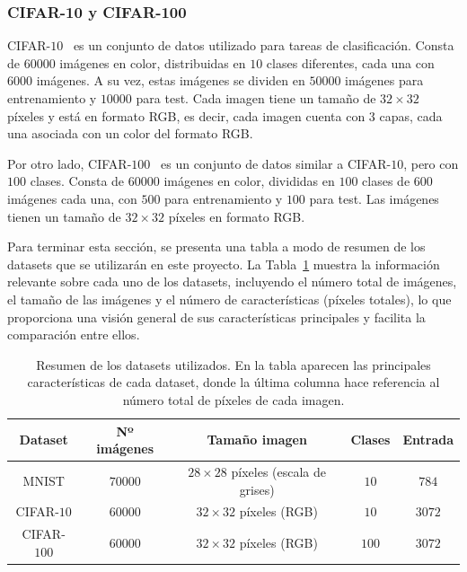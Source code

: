 \subsubsection{CIFAR-10 y CIFAR-100}\label{subsubsec:CIFAR10-y-CIFAR100}

CIFAR-$10$~\cite{Krizhevsky2009} es un conjunto de datos utilizado para tareas de clasificación. Consta de $60000$ imágenes en color, distribuidas en $10$ clases diferentes, cada una con $6000$ imágenes. A su vez, estas imágenes se dividen en $50000$ imágenes para entrenamiento y $10000$ para test. Cada imagen tiene un tamaño de $32 \times 32$ píxeles y está en formato RGB, es decir, cada imagen cuenta con $3$ capas, cada una asociada con un color del formato RGB.\newline

Por otro lado, CIFAR-$100$~\cite{Krizhevsky2009} es un conjunto de datos similar a CIFAR-$10$, pero con $100$ clases. Consta de $60000$ imágenes en color, divididas en $100$ clases de $600$ imágenes cada una, con $500$ para entrenamiento y $100$ para test. Las imágenes tienen un tamaño de $32 \times 32$ píxeles en formato RGB.\newline

Para terminar esta sección, se presenta una tabla a modo de resumen de los datasets que se utilizarán en este proyecto. La Tabla~\ref{tab:datasets} muestra la información relevante sobre cada uno de los datasets, incluyendo el número total de imágenes, el tamaño de las imágenes y el número de características (píxeles totales), lo que proporciona una visión general de sus características principales y facilita la comparación entre ellos.\newline

\begin{table}[h]
    \centering
    \begin{tabular}{|c|c|c|c|c|}
    \hline
    \textbf{Dataset} & \textbf{Nº imágenes} & \textbf{Tamaño imagen} & \textbf{Clases} & \textbf{Entrada} \\
    \hline
    MNIST & $70000$ & $28 \times 28$ píxeles (escala de grises) & $10$ & $784$ \\
    CIFAR-$10$ & $60000$ & $32 \times 32$ píxeles (RGB) & $10$ & $3072$ \\
    CIFAR-$100$ & $60000$ & $32 \times 32$ píxeles (RGB) & $100$ & $3072$ \\
    \hline
    \end{tabular}
    \caption[Resumen de los datasets utilizados.]{Resumen de los datasets utilizados. En la tabla aparecen las principales características de cada dataset, donde la última columna hace referencia al número total de píxeles de cada imagen.}\label{tab:datasets}
\end{table}

